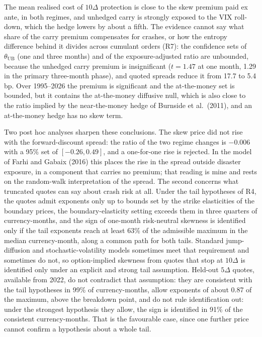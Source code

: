 \documentclass[11pt]{article}
\theoremstyle{result}
\newcommand{\thUB}{\theta_{\mathrm{UB}}}
\newcommand{\D}{\Delta}
\begin{document}
The mean realised cost of $10\D$ protection is close to the skew premium paid ex ante, in both regimes, and unhedged carry is strongly exposed to the VIX roll-down, which the hedge lowers by about a fifth. The evidence cannot say what share of the carry premium compensates for crashes, or how the entropy difference behind it divides across cumulant orders (R7): the confidence sets of $\thUB$ (one and three months) and of the exposure-adjusted ratio are unbounded, because the unhedged carry premium is insignificant ($t=1.47$ at one month, 1.29 in the primary three-month phase), and quoted spreads reduce it from 17.7 to 5.4 bp. Over 1995--2026 the premium is significant and the at-the-money set is bounded, but it contains the at-the-money diffusive null, which is also close to the ratio implied by the near-the-money hedge of Burnside et al.\ (2011), and an at-the-money hedge has no skew term.

Two post hoc analyses sharpen these conclusions. The skew price did not rise with the forward-discount spread: the ratio of the two regime changes is $-0.006$ with a 95\% set of $[-0.26,0.49]$, and a one-for-one rise is rejected. In the model of Farhi and Gabaix (2016) this places the rise in the spread outside disaster exposure, in a component that carries no premium; that reading is mine and rests on the random-walk interpretation of the spread. The second concerns what truncated quotes can say about crash risk at all. Under the tail hypotheses of R4, the quotes admit exponents only up to bounds set by the strike elasticities of the boundary prices, the boundary-elasticity setting exceeds them in three quarters of currency-months, and the sign of one-month risk-neutral skewness is identified only if the tail exponents reach at least 63\% of the admissible maximum in the median currency-month, along a common path for both tails. Standard jump-diffusion and stochastic-volatility models sometimes meet that requirement and sometimes do not, so option-implied skewness from quotes that stop at $10\D$ is identified only under an explicit and strong tail assumption. Held-out $5\D$ quotes, available from 2022, do not contradict that assumption: they are consistent with the tail hypotheses in 99\% of currency-months, allow exponents of about 0.87 of the maximum, above the breakdown point, and do not rule identification out: under the strongest hypothesis they allow, the sign is identified in 91\% of the consistent currency-months. That is the favourable case, since one further price cannot confirm a hypothesis about a whole tail.
\end{document}
